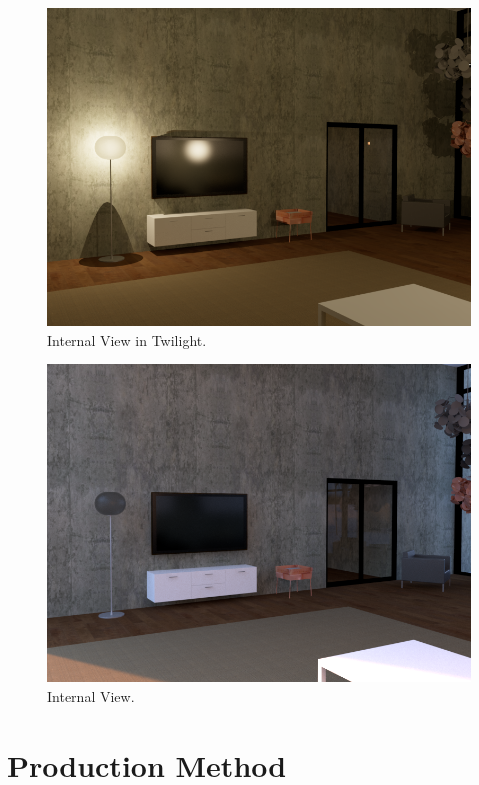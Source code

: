 \begin{figure}[h]
	\centering
	\includegraphics[width=1.0\linewidth]{img/Assignment3c}
	\caption{Internal View in Twilight.}
	\label{fig:assignment3c}
\end{figure}

\begin{figure}[h]
	\centering
	\includegraphics[width=1.0\linewidth]{img/Assignment3d}
	\caption{Internal View.}
	\label{fig:assignment3d}
\end{figure}




\newpage

\section*{Production Method}

